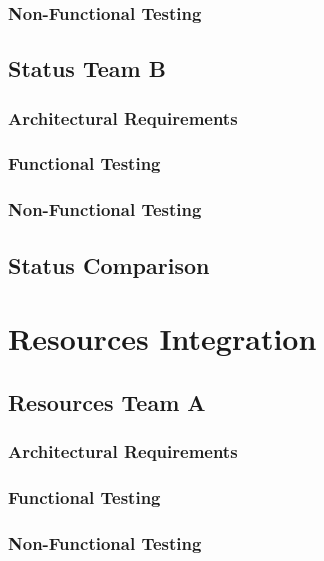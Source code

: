 \documentclass[12pt, oneside]{article}
\begin{document}
		\subsubsection{Non-Functional Testing }
			
	
	\subsection{Status Team B}	
		\subsubsection{Architectural Requirements}
			
		\subsubsection{Functional Testing}
			
		\subsubsection{Non-Functional Testing }
			
	
	\subsection{Status Comparison}
\newpage 
\section{Resources Integration}
	\subsection{Resources Team A}	
		\subsubsection{Architectural Requirements}
			
		\subsubsection{Functional Testing}
			
		\subsubsection{Non-Functional Testing }
			
	
\end{document}
